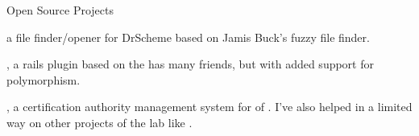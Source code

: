 \begin{rubric}{Open Source Projects}{ 



\entry* 
    \textbf{} a
    file finder/opener for DrScheme based on Jamis Buck's fuzzy file finder.


\entry* 
    \textbf{}, a rails
    plugin based on the has many friends, but with added support for
    polymorphism.

\entry* 
    \textbf{}, a
    certification authority management system for  of
    .  I've also helped in a limited
    way on other projects of the lab like
    .

}\end{rubric}
